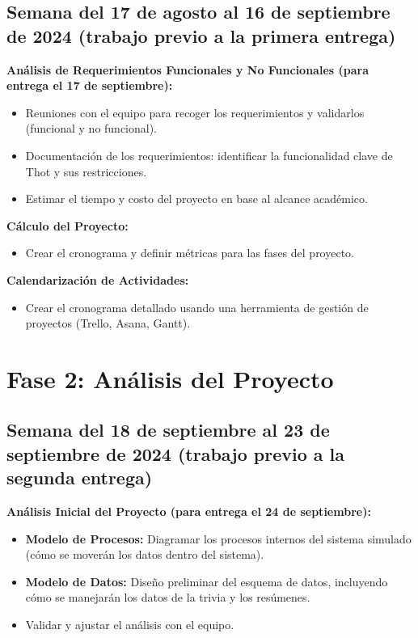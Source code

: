 \documentclass{report}
\begin{document}
    \subsection*{Semana del 17 de agosto al 16 de septiembre de 2024 (trabajo previo a la primera entrega)}
    \textbf{Análisis de Requerimientos Funcionales y No Funcionales (para entrega el 17 de septiembre):}
    \begin{itemize}
        \item Reuniones con el equipo para recoger los requerimientos y validarlos (funcional y no funcional).
        \item Documentación de los requerimientos: identificar la funcionalidad clave de Thot y sus restricciones.
        \item Estimar el tiempo y costo del proyecto en base al alcance académico.
    \end{itemize}
    \textbf{Cálculo del Proyecto:}
    \begin{itemize}
        \item Crear el cronograma y definir métricas para las fases del proyecto.
    \end{itemize}
    \textbf{Calendarización de Actividades:}
    \begin{itemize}
        \item Crear el cronograma detallado usando una herramienta de gestión de proyectos (Trello, Asana, Gantt).
    \end{itemize}

    \section*{Fase 2: Análisis del Proyecto}
    \subsection*{Semana del 18 de septiembre al 23 de septiembre de 2024 (trabajo previo a la segunda entrega)}
    \textbf{Análisis Inicial del Proyecto (para entrega el 24 de septiembre):}
    \begin{itemize}
        \item \textbf{Modelo de Procesos:} Diagramar los procesos internos del sistema simulado (cómo se moverán los datos dentro del sistema).
        \item \textbf{Modelo de Datos:} Diseño preliminar del esquema de datos, incluyendo cómo se manejarán los datos de la trivia y los resúmenes.
        \item Validar y ajustar el análisis con el equipo.
    \end{itemize}
\end{document}
